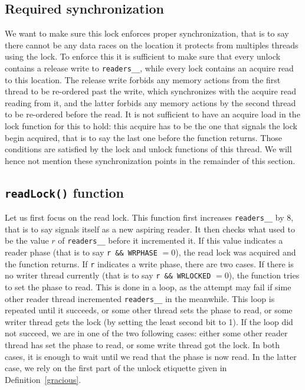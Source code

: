 		\subsection{Required synchronization}
		\label{synchGlib}
We want to make sure this lock enforces proper synchronization, that is to say there cannot be any data races on the location it protects from multiples threads using the lock. To enforce this it is sufficient to make sure that every unlock contains a release write to \texttt{readers\_\_}, while every lock contains an acquire read to this location. The release write forbids any memory actions from the first thread to be re-ordered past the write, which synchronizes with the acquire read reading from it, and the latter forbids any memory actions by the second thread to be re-ordered before the read. It is not sufficient to have an acquire load in the lock function for this to hold: this acquire has to be the one that signals the lock begin acquired, that is to say the last one before the function returns. Those conditions are satisfied by the lock and unlock functions of this thread. We will hence not mention these synchronization points in the remainder of this section.

		\subsection{\texttt{readLock()} function}

		Let us first focus on the read lock. This function first increases \texttt{readers\_\_} by 8, that is to say signals itself as a new aspiring reader. It then checks what used to be the value $r$ of \texttt{readers\_\_} before it incremented it. If this value indicates a reader phase (that is to say \texttt{r \&\& WRPHASE} $ = 0$), the read lock was acquired and the function returns. If \texttt{r} indicates a write phase, there are two cases. If there is no writer thread currently (that is to say \texttt{r \&\& WRLOCKED} $= 0$), the function tries to set the phase to read. This is done in a loop, as the attempt may fail if sime other reader thread incremented \texttt{readers\_\_} in the meanwhile. This loop is repeated until it succeeds, or some other thread sets the phase to read, or some writer thread gets the lock (by setting the least second bit to 1). If the loop did not succeed, we are in one of the two following cases: either some other reader thread has set the phase to read, or some write thread got the lock. In both cases, it is enough to wait until we read that the phase is now read. In the latter case, we rely on the first part of the unlock etiquette given in Definition~\ref{gracious}.

